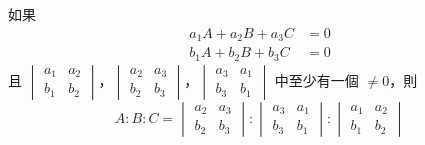 \begin{example}\label{ex:4-4-3}
如果
\begin{align*}
  a_1 A + a_2 B + a_3 C &= 0 \\
  b_1 A + b_2 B + b_3 C &= 0
\end{align*}
且 $\begin{vmatrix} a_1 & a_2 \\ b_1 & b_2 \end{vmatrix}$，$\begin{vmatrix} a_2 & a_3 \\ b_2 & b_3 \end{vmatrix}$，$\begin{vmatrix} a_3 & a_1 \\ b_3 & b_1 \end{vmatrix}$ 中至少有一個 $\neq 0$，則
\begin{equation*}
  A : B : C = \begin{vmatrix} a_2 & a_3 \\ b_2 & b_3 \end{vmatrix} : \begin{vmatrix} a_3 & a_1 \\ b_3 & b_1 \end{vmatrix} : \begin{vmatrix} a_1 & a_2 \\ b_1 & b_2 \end{vmatrix}
\end{equation*}
\end{example}

